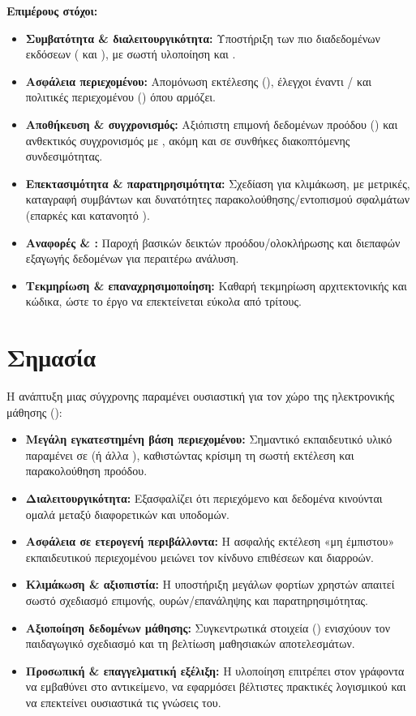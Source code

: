 \noindent \textbf{Επιμέρους στόχοι:}
\begin{itemize}
  \item \textbf{Συμβατότητα \& διαλειτουργικότητα:} Υποστήριξη των πιο διαδεδομένων εκδόσεων  ( και ), με σωστή υλοποίηση  και .
  \item \textbf{Ασφάλεια περιεχομένου:} Απομόνωση εκτέλεσης (), έλεγχοι έναντι / και πολιτικές περιεχομένου () όπου αρμόζει.
  \item \textbf{Αποθήκευση \& συγχρονισμός:} Αξιόπιστη επιμονή δεδομένων προόδου () και ανθεκτικός συγχρονισμός με , ακόμη και σε συνθήκες διακοπτόμενης συνδεσιμότητας.
  \item \textbf{Επεκτασιμότητα \& παρατηρησιμότητα:} Σχεδίαση για κλιμάκωση, με μετρικές, καταγραφή συμβάντων και δυνατότητες παρακολούθησης/εντοπισμού σφαλμάτων (επαρκές και κατανοητό ).
  \item \textbf{Αναφορές \& :} Παροχή βασικών δεικτών προόδου/ολοκλήρωσης και διεπαφών εξαγωγής δεδομένων για περαιτέρω ανάλυση.
  \item \textbf{Τεκμηρίωση \& επαναχρησιμοποίηση:} Καθαρή τεκμηρίωση αρχιτεκτονικής και κώδικα, ώστε το έργο να επεκτείνεται εύκολα από τρίτους.
\end{itemize}

\section{Σημασία}
Η ανάπτυξη μιας σύγχρονης  παραμένει ουσιαστική για τον χώρο της ηλεκτρονικής μάθησης ():
\begin{itemize}
  \item \textbf{Μεγάλη εγκατεστημένη βάση περιεχομένου:} Σημαντικό εκπαιδευτικό υλικό παραμένει σε  (ή άλλα ), καθιστώντας κρίσιμη τη σωστή εκτέλεση και παρακολούθηση προόδου.
  \item \textbf{Διαλειτουργικότητα:} Εξασφαλίζει ότι περιεχόμενο και δεδομένα κινούνται ομαλά μεταξύ διαφορετικών  και υποδομών.
  \item \textbf{Ασφάλεια σε ετερογενή περιβάλλοντα:} Η ασφαλής εκτέλεση «μη έμπιστου» εκπαιδευτικού περιεχομένου μειώνει τον κίνδυνο επιθέσεων και διαρροών.
  \item \textbf{Κλιμάκωση \& αξιοπιστία:} Η υποστήριξη μεγάλων φορτίων χρηστών απαιτεί σωστό σχεδιασμό επιμονής, ουρών/επανάληψης και παρατηρησιμότητας.
  \item \textbf{Αξιοποίηση δεδομένων μάθησης:} Συγκεντρωτικά στοιχεία () ενισχύουν τον παιδαγωγικό σχεδιασμό και τη βελτίωση μαθησιακών αποτελεσμάτων.
  \item \textbf{Προσωπική \& επαγγελματική εξέλιξη:} Η υλοποίηση επιτρέπει στον γράφοντα να εμβαθύνει στο αντικείμενο, να εφαρμόσει βέλτιστες πρακτικές λογισμικού και να επεκτείνει ουσιαστικά τις γνώσεις του.
\end{itemize}

